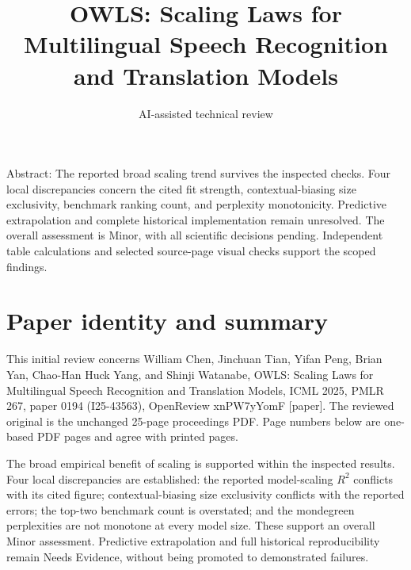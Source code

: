 \documentclass[10pt]{article}
\title{OWLS: Scaling Laws for Multilingual Speech Recognition and Translation Models}
\author{AI-assisted technical review}
\date{}
\begin{document}
\maketitle
Abstract: The reported broad scaling trend survives the inspected checks. Four local discrepancies concern the cited fit strength, contextual-biasing size exclusivity, benchmark ranking count, and perplexity monotonicity. Predictive extrapolation and complete historical implementation remain unresolved. The overall assessment is Minor, with all scientific decisions pending. Independent table calculations and selected source-page visual checks support the scoped findings.\par
\section*{Paper identity and summary}
This initial review concerns William Chen, Jinchuan Tian, Yifan Peng, Brian Yan, Chao-Han Huck Yang, and Shinji Watanabe, OWLS: Scaling Laws for Multilingual Speech Recognition and Translation Models, ICML 2025, PMLR 267, paper 0194 (I25-43563), OpenReview xnPW7yYomF [paper]. The reviewed original is the unchanged 25-page proceedings PDF. Page numbers below are one-based PDF pages and agree with printed pages.\par
The broad empirical benefit of scaling is supported within the inspected results. Four local discrepancies are established: the reported model-scaling \(R^2\) conflicts with its cited figure; contextual-biasing size exclusivity conflicts with the reported errors; the top-two benchmark count is overstated; and the mondegreen perplexities are not monotone at every model size. These support an overall Minor assessment. Predictive extrapolation and full historical reproducibility remain Needs Evidence, without being promoted to demonstrated failures.\par
\end{document}
